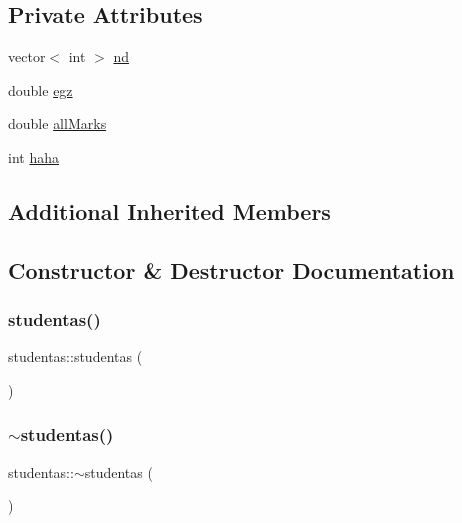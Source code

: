 \subsection*{Private Attributes}
\begin{DoxyCompactItemize}
\item 
vector$<$ int $>$ \mbox{\hyperlink{classstudentas_a8aef5bd85b89d611446851d143303d35}{nd}}
\item 
double \mbox{\hyperlink{classstudentas_ae7145730b8737e3ceb2173bcb7460b2d}{egz}}
\item 
double \mbox{\hyperlink{classstudentas_abd4b8e8c8d3db9ebd04865e8441cd46f}{all\+Marks}}
\item 
int \mbox{\hyperlink{classstudentas_af3d5908e76c35d49ffca65ac4d62665c}{haha}}
\end{DoxyCompactItemize}
\subsection*{Additional Inherited Members}


\subsection{Constructor \& Destructor Documentation}
\mbox{\label{classstudentas_a40a99ea5d527a3d443123f4785550787}} 
\subsubsection{\texorpdfstring{studentas()}{studentas()}}
{\footnotesize\ttfamily studentas\+::studentas (\begin{DoxyParamCaption}{ }\end{DoxyParamCaption})\hspace{0.3cm}{\ttfamily [inline]}}

\mbox{\label{classstudentas_a74b639e1a2ffe282686999b931eb4aaa}} 
\subsubsection{\texorpdfstring{$\sim$studentas()}{~studentas()}}
{\footnotesize\ttfamily studentas\+::$\sim$studentas (\begin{DoxyParamCaption}{ }\end{DoxyParamCaption})\hspace{0.3cm}{\ttfamily [inline]}}



